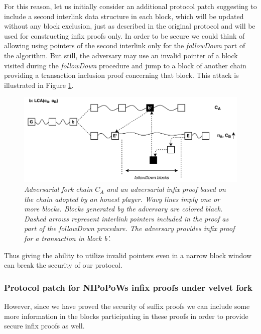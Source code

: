 \documentclass[10pt,a4paper]{article}
\theoremstyle{plain}
\theoremstyle{definition}
\theoremstyle{lemma}
\begin{document}
For this reason, let us initially consider an additional protocol patch suggesting to include
a second interlink data structure in each block, which will be updated without any block exclusion,
just as described in the original protocol and will be used for constructing infix proofs only. In
order to be secure we could think of allowing using pointers of the second interlink only for the
\textit{followDown} part of the algorithm. But still, the adversary may use an invalid pointer of a
block visited during the \textit{followDown} procedure and jump to a block of another chain providing 
a transaction inclusion proof concerning that block. This attack is illustrated in
Figure \ref{fig:infix_attack}.

\begin{figure}[h!]
	\begin{center}
		\includegraphics[scale=0.75]{figures/infix_attack.pdf}
	\end{center}
	\caption{\textit{Adversarial fork chain $C_A$ and an adversarial infix proof based on the chain
	 adopted by an honest player. Wavy lines imply one or more blocks. Blocks generated by the
	 adversary are colored black. Dashed arrows represent interlink pointers included in the proof
	 as part of the \textit{followDown} procedure. The adversary provides infix proof for a
	 transaction in block b'. }}
	\label{fig:infix_attack}
\end{figure}

Thus giving the ability to utilize invalid pointers even in a narrow block window can break the
security of our protocol. 

\subsubsection*{Protocol patch for NIPoPoWs infix proofs under velvet fork}
However, since we have proved the security of suffix proofs we can include some more information
in the blocks participating in these proofs in order to provide secure infix proofs as well.
 
\end{document}

